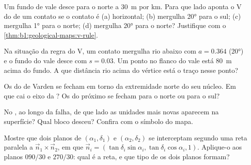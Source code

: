 \begin{exercise}[$\star\star$]\label{exo:b1:geological-maps:6}
Um fundo de vale desce para o norte a \qty{30}{m} por km. Para que lado aponta o V do  de um contato se o contato é (a) horizontal; (b) mergulha \ang{20} para o sul; (c) mergulha \ang{1} para o norte; (d) mergulha \ang{20} para o norte? Justifique com o \cref{thm:b1:geological-maps:v-rule}.
\end{exercise}

\begin{exercise}[$\star\star$]\label{exo:b1:geological-maps:7}
Na situação da regra do V, um contato mergulha rio abaixo com $a = 0.364$ (\ang{20}) e o fundo do vale desce com $s = 0.03$. Um ponto no flanco do vale está \qty{80}{m} acima do fundo. A que distância rio acima do vértice está o traço nesse ponto?
\end{exercise}

\begin{exercise}[$\star\star$]\label{exo:b1:geological-maps:8}
Os  do  de Varden se fecham em torno da extremidade norte do seu núcleo. Em que  cai o eixo da ? Os  do  próximo se fecham para o norte ou para o sul?
\end{exercise}

\begin{exercise}[$\star\star$]\label{exo:b1:geological-maps:9}
No , ao longo da falha, de que lado as unidades mais novas aparecem na superfície? Qual bloco desceu? Confira com o símbolo do mapa.
\end{exercise}

\begin{exercise}[$\star\star\star$]\label{exo:b1:geological-maps:10}
Mostre que dois planos de  $(\alpha_1, \delta_1)$ e
$(\alpha_2, \delta_2)$ se interceptam segundo uma reta paralela a
$\vec n_1 \times \vec n_2$, em que $\vec n_i = (\tan\delta_i\sin\alpha_i,
\tan\delta_i\cos\alpha_i, 1)$. Aplique-o aos planos $090/30$ e $270/30$:
qual é a reta, e que tipo de  os dois planos formam?
\end{exercise}

